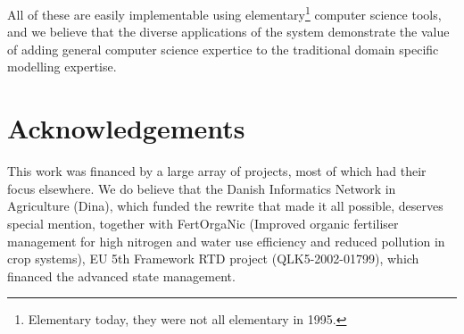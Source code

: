 \documentclass[a4paper]{article}
\begin{document}
All of these are easily implementable using
elementary\footnote{Elementary today, they were not all elementary in
1995.}  computer science tools, and we believe that the diverse
applications of the system demonstrate the value of adding general
computer science expertice to the traditional domain specific
modelling expertise.

\section{Acknowledgements}

This work was financed by a large array of projects, most of which had
their focus elsewhere.  We do believe that the Danish Informatics
Network in Agriculture (Dina), which funded the rewrite that made it
all possible, deserves special mention, together with FertOrgaNic
(Improved organic fertiliser management for high nitrogen and water
use efficiency and reduced pollution in crop systems), EU 5th
Framework RTD project (QLK5-2002-01799), which financed the advanced
state management.


\end{document}

